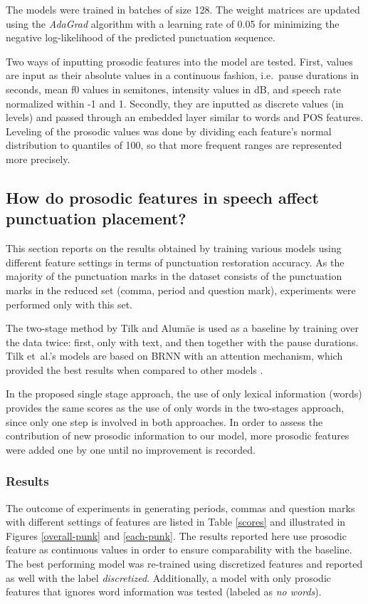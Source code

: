 The models were trained in batches of size 128. The weight matrices are updated using the \textit{AdaGrad} algorithm \citep{adagrad} with a learning rate of 0.05 for minimizing the negative log-likelihood of the predicted punctuation sequence. 

Two ways of inputting prosodic features into the model are tested. First, values are input as their absolute values in a continuous fashion, i.e.~pause durations in seconds, mean f0 values in semitones, intensity values in dB, and speech rate normalized within -1 and 1. Secondly, they are inputted as discrete values (in levels) and passed through an embedded layer similar to words and POS features. Leveling of the prosodic values was done by dividing each feature's normal distribution to quantiles of 100, so that more frequent ranges are represented more precisely. 

\subsection{How do prosodic features in speech affect punctuation placement?}
\label{punkProse:experiments:q1}
This section reports on the results obtained by training various models using different feature settings in terms of punctuation restoration accuracy. As the majority of the punctuation marks in the dataset consists of the punctuation marks in the reduced set (comma, period and question mark), experiments were performed only with this set.

The two-stage method by Tilk and Alumäe is used as a baseline by training over the data twice: first, only with text, and then together with the pause durations. Tilk et~al.'s models are based on BRNN with an attention mechanism, which provided the best results when compared to other models \citep{tilk2016bidirectional}.

In the proposed single stage approach, the use of only lexical information (words) provides the same scores as the use of only words in the two-stages approach, since only one step is involved in both approaches. In order to assess the contribution of new prosodic information to our model, more prosodic features were added one by one until no improvement is recorded. 

\subsubsection{Results}
The outcome of experiments in generating periods, commas and question marks with different settings of features are listed in Table \ref{scores} and illustrated in Figures \ref{overall-punk} and \ref{each-punk}. The results reported here use prosodic feature as continuous values in order to ensure comparability with the baseline. The best performing model was re-trained using discretized features and reported as well with the label \textit{discretized}. Additionally, a model with only prosodic features that ignores word information was tested (labeled as \textit{no words}). 

